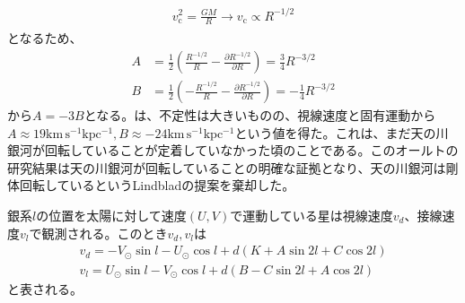 \begin{align}
\begin{aligned}
    v_{\mathrm{c}}^2 = \frac{GM}{R} \to v_{\mathrm{c}} \propto R^{-1/2}
\end{aligned}
\end{align}
となるため、
\begin{subequations}
\begin{align}
	A &=\frac{1}{2}\left( \frac{R^{-1/2}}{R} - \frac{\partial R^{-1/2}}{\partial R} \right) = \frac{3}{4}R^{-3/2}\\
	B &=\frac{1}{2}\left( -\frac{R^{-1/2}}{R} - \frac{\partial R^{-1/2}}{\partial R} \right) = -\frac{1}{4}R^{-3/2}
\end{align}
\end{subequations}
から$A=-3B$となる。\cite{Oort1927b}は、不定性は大きいものの、視線速度と固有運動から$A\approx 19 \mathrm{km\,s^{-1} kpc^{-1}}, B\approx -24 \mathrm{km\,s^{-1} kpc^{-1}}$という値を得た。これは、まだ天の川銀河が回転していることが定着していなかった頃のことである。このオールトの研究結果は天の川銀河が回転していることの明確な証拠となり、天の川銀河は剛体回転しているというLindbladの提案を棄却した。

銀系$l$の位置を太陽に対して速度$(U,V)$で運動している星は視線速度$v_d$、接線速度$v_l$で観測される。このとき$v_d,v_l$は
\begin{subequations}
\begin{align}
    v_d = -V_{\odot}\sin{l} - U_{\odot}\cos{l} + d(K+A\sin{2l}+C\cos{2l}) \label{eq:6} \\
    v_l = U_{\odot}\sin{l} - V_{\odot}\cos{l} + d(B-C\sin{2l}+A\cos{2l}) \label{eq:7}
\end{align}
\end{subequations}
と表される。



